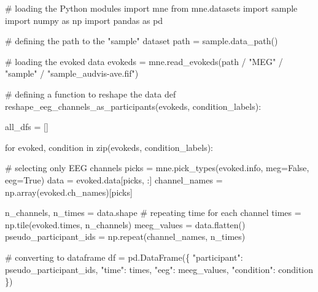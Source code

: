 \documentclass[
  doc,
  floatsintext,
  longtable,
  a4paper,
  nolmodern,
  notxfonts,
  notimes,
  colorlinks=true,linkcolor=blue,citecolor=blue,urlcolor=blue]{apa7}
\newenvironment{Shaded}{\begin{snugshade}}{\end{snugshade}}
\newcommand{\BuiltInTok}[1]{\textcolor[rgb]{0.00,0.23,0.31}{#1}}
\newcommand{\CommentTok}[1]{\textcolor[rgb]{0.37,0.37,0.37}{#1}}
\newcommand{\ControlFlowTok}[1]{\textcolor[rgb]{0.00,0.23,0.31}{#1}}
\newcommand{\ImportTok}[1]{\textcolor[rgb]{0.00,0.46,0.62}{#1}}
\newcommand{\KeywordTok}[1]{\textcolor[rgb]{0.00,0.23,0.31}{#1}}
\newcommand{\NormalTok}[1]{\textcolor[rgb]{0.00,0.23,0.31}{#1}}
\newcommand{\OperatorTok}[1]{\textcolor[rgb]{0.37,0.37,0.37}{#1}}
\newcommand{\StringTok}[1]{\textcolor[rgb]{0.13,0.47,0.30}{#1}}
\newcommand{\VariableTok}[1]{\textcolor[rgb]{0.07,0.07,0.07}{#1}}
\begin{document}
\begin{Shaded}
\begin{Highlighting}[]
\CommentTok{\# loading the Python modules}
\ImportTok{import}\NormalTok{ mne}
\ImportTok{from}\NormalTok{ mne.datasets }\ImportTok{import}\NormalTok{ sample}
\ImportTok{import}\NormalTok{ numpy }\ImportTok{as}\NormalTok{ np}
\ImportTok{import}\NormalTok{ pandas }\ImportTok{as}\NormalTok{ pd}

\CommentTok{\# defining the path to the "sample" dataset}
\NormalTok{path }\OperatorTok{=}\NormalTok{ sample.data\_path()}

\CommentTok{\# loading the evoked data}
\NormalTok{evokeds }\OperatorTok{=}\NormalTok{ mne.read\_evokeds(path }\OperatorTok{/} \StringTok{"MEG"} \OperatorTok{/} \StringTok{"sample"} \OperatorTok{/} \StringTok{"sample\_audvis{-}ave.fif"}\NormalTok{)}

\CommentTok{\# defining a function to reshape the data}
\KeywordTok{def}\NormalTok{ reshape\_eeg\_channels\_as\_participants(evokeds, condition\_labels):}
    
\NormalTok{    all\_dfs }\OperatorTok{=}\NormalTok{ []}

    \ControlFlowTok{for}\NormalTok{ evoked, condition }\KeywordTok{in} \BuiltInTok{zip}\NormalTok{(evokeds, condition\_labels):}
        
        \CommentTok{\# selecting only EEG channels}
\NormalTok{        picks }\OperatorTok{=}\NormalTok{ mne.pick\_types(evoked.info, meg}\OperatorTok{=}\VariableTok{False}\NormalTok{, eeg}\OperatorTok{=}\VariableTok{True}\NormalTok{)}
\NormalTok{        data }\OperatorTok{=}\NormalTok{ evoked.data[picks, :]}
\NormalTok{        channel\_names }\OperatorTok{=}\NormalTok{ np.array(evoked.ch\_names)[picks]}

\NormalTok{        n\_channels, n\_times }\OperatorTok{=}\NormalTok{ data.shape}
        \CommentTok{\# repeating time for each channel}
\NormalTok{        times }\OperatorTok{=}\NormalTok{ np.tile(evoked.times, n\_channels)}
\NormalTok{        meeg\_values }\OperatorTok{=}\NormalTok{ data.flatten()}
\NormalTok{        pseudo\_participant\_ids }\OperatorTok{=}\NormalTok{ np.repeat(channel\_names, n\_times)}
        
        \CommentTok{\# converting to dataframe}
\NormalTok{        df }\OperatorTok{=}\NormalTok{ pd.DataFrame(\{}
            \StringTok{"participant"}\NormalTok{: pseudo\_participant\_ids,}
            \StringTok{"time"}\NormalTok{: times,}
            \StringTok{"eeg"}\NormalTok{: meeg\_values,}
            \StringTok{"condition"}\NormalTok{: condition}
\NormalTok{            \})}


\end{Highlighting}
\end{Shaded}
\end{document}

